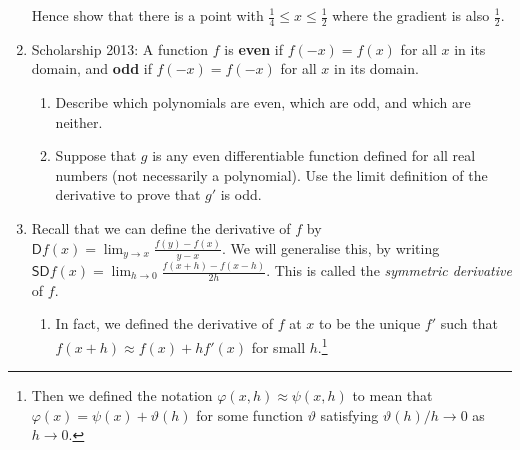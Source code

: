 \begin{enumerate}
        Hence show that there is a point with $ \frac{1}{4} \leq x \leq \frac{1}{2} $ where the gradient is also $ \frac{1}{2} $.
  \item Scholarship 2013: A function $ f $ is \textbf{even} if $ f(-x) = f(x) $ for all $ x $ in its domain, and \textbf{odd} if $ f(-x) = f(-x) $
        for all $ x $ in its domain.
    \begin{enumerate}
      \item Describe which polynomials are even, which are odd, and which are neither.
      \item Suppose that $ g $ is any even differentiable function defined for all real numbers (not necessarily a polynomial). Use the
            limit definition of the derivative to prove that $ g' $ is odd.
    \end{enumerate}
  \item Recall that we can define the derivative of $ f $ by $ \mathsf{D}f(x) = \lim_{y \to x} \frac{f(y) - f(x)}{y - x} $.
        We will generalise this, by writing $ \mathsf{SD}f(x) = \lim_{h \to 0} \frac{f(x + h) - f(x - h)}{2h} $.
        This is called the \emph{symmetric derivative} of $ f $.
    \begin{enumerate}
      \item In fact, we defined the derivative of $ f $ at $ x $ to be the unique $ f' $ such that $ f(x + h) \approx f(x) + hf'(x) $
            for small $ h $.\footnote{Then we defined the notation $ \varphi(x,h) \approx \psi(x,h) $ to mean that $ \varphi(x) = \psi(x) + \vartheta(h) $
            for some function $ \vartheta $ satisfying $ \vartheta(h)/h \to 0 $ as $ h \to 0 $.}


\end{enumerate}
\end{enumerate}
